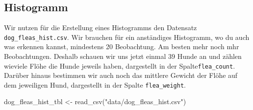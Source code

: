 \documentclass[
  letterpaper,
  DIV=11,
  oneside]{scrreport}
\newenvironment{Shaded}{\begin{snugshade}}{\end{snugshade}}
\newcommand{\FunctionTok}[1]{\textcolor[rgb]{0.28,0.35,0.67}{#1}}
\newcommand{\NormalTok}[1]{\textcolor[rgb]{0.00,0.23,0.31}{#1}}
\newcommand{\OtherTok}[1]{\textcolor[rgb]{0.00,0.23,0.31}{#1}}
\newcommand{\StringTok}[1]{\textcolor[rgb]{0.13,0.47,0.30}{#1}}
\begin{document}
\hypertarget{sec-eda-histogramm}{%
\subsection{Histogramm}\label{sec-eda-histogramm}}

Wir nutzen für die Erstellung eines Histogramms den Datensatz
\texttt{dog\_fleas\_hist.csv}. Wir brauchen für ein anständiges
Histogramm, wo du auch was erkennen kannst, mindestens 20 Beobachtung.
Am besten mehr noch mhr Beobachtungen. Deshalb schauen wir uns jetzt
einmal 39 Hunde an und zählen wieviele Flöhe die Hunde jeweils haben,
dargestellt in der Spalte\texttt{flea\_count}. Darüber hinaus bestimmen
wir auch noch das mittlere Gewicht der Flöhe auf dem jeweiligen Hund,
dargestellt in der Spalte \texttt{flea\_weight}.

\begin{Shaded}
\begin{Highlighting}[]
\NormalTok{dog\_fleas\_hist\_tbl }\OtherTok{\textless{}{-}} \FunctionTok{read\_csv}\NormalTok{(}\StringTok{"data/dog\_fleas\_hist.csv"}\NormalTok{)}
\end{Highlighting}
\end{Shaded}
\end{document}
